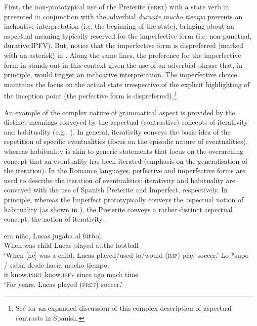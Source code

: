 \documentclass[output=paper,modfonts,nonflat,newtxmath]{langsci/langscibook}
\begin{document}
First, the non-prototypical use of the Preterite (\textsc{pret}) with a state verb in  presented in conjunction with the adverbial \textit{durante} \textit{mucho} \textit{tiempo} prevents an inchoative interpretation (i.e. the beginning of the state), bringing about an aspectual meaning typically reserved for the imperfective form (i.e. non-punctual, durative;IPFV). But, notice that the imperfective form is dispreferred (marked with an asterisk) in . Along the same lines, the preference for the imperfective form in  stands out in this context given the use of an adverbial phrase that, in principle, would trigger an inchoative interpretation. The imperfective choice maintains the focus on the actual state irrespective of the explicit highlighting of the inception point (the perfective form is dispreferred).\footnote{See \citet{Doiz2002} for an expanded discussion of this complex description of aspectual contrasts in Spanish.}

An example of the complex nature of grammatical aspect is provided by the distinct meanings conveyed by the aspectual (contrastive) concepts of iterativity and habituality (e.g., \citealt{deSwart1998, Langacker1999}). In general, iterativity conveys the basic idea of the repetition of specific eventualities (focus on the episodic nature of eventualities), whereas habituality is akin to generic statements that focus on the overarching concept that an eventuality has been iterated (emphasis on the generalisation of the iteration). In the Romance languages, perfective and imperfective forms are used to describe the iteration of eventualities: iterativity and habituality are conveyed with the use of Spanish Preterite and Imperfect, respectively. In principle, whereas the Imperfect prototypically conveys the aspectual notion of habituality (as shown in ), the Preterite conveys a rather distinct aspectual concept, the notion of iterativity .

\ea \label{ex:salaberry:2}
\begin{xlist}
\ex \label{ex:salaberry:2a}
 {era} {niño,} {Lucas} {jugaba} {al} {fútbol}.\\
When was child Lucas played at.the football \\
\glt  ‘When [he] was a child, Lucas played/used to/would (\textsc{imp}) play soccer.’
\ex \label{ex:salaberry:2b}
\gll Lo *supo  / sabía  desde hacía mucho tiempo.\\
it know.\textsc{pret} {} know.\textsc{ipfv} since ago much time\\
\glt ‘For years, Lucas played (\textsc{pret}) soccer.’
\end{xlist}
\z
\end{document}
